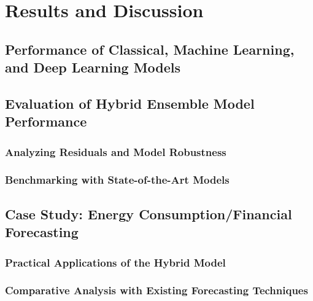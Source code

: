 \chapter{Results and Discussion}

\section{Performance of Classical, Machine Learning, and Deep Learning Models} %

\section{Evaluation of Hybrid Ensemble Model Performance} %
\subsection{Analyzing Residuals and Model Robustness} %

\subsection{Benchmarking with State-of-the-Art Models} %

\section{Case Study: Energy Consumption/Financial Forecasting} %
\subsection{Practical Applications of the Hybrid Model} %

\subsection{Comparative Analysis with Existing Forecasting Techniques} %
